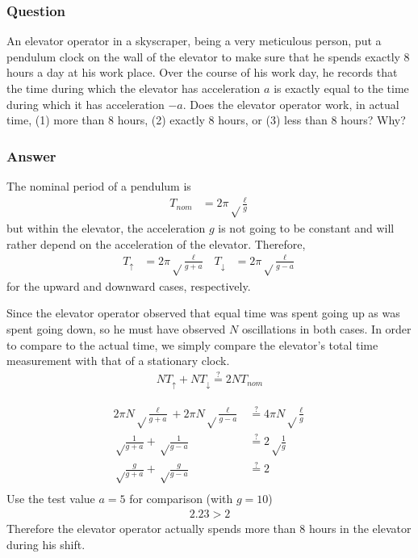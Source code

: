 \subsubsection{Question}

An elevator operator in a skyscraper, being a very meticulous person, put a
pendulum clock on the wall of the elevator to make sure that he spends exactly 8
hours a day at his work place. Over the course of his work day, he records that
the time during which the elevator has acceleration $a$ is exactly equal to the
time during which it has acceleration $-a$. Does the elevator operator work, in
actual time, (1) more than 8 hours, (2) exactly 8 hours, or (3) less than 8
hours? Why?

\subsubsection{Answer}
The nominal period of a pendulum is
\begin{align*}
	T_{nom} &= 2{\pi} \sqrt\frac{\ell }{g}
\end{align*}
but within the elevator, the acceleration $g$ is not going to be constant and
will rather depend on the acceleration of the elevator. Therefore,
\begin{align*}
	T_\uparrow &= 2{\pi}\sqrt\frac{\ell }{g+a} & T_\downarrow &= 2{\pi}\sqrt\frac{\ell }{g-a}
\end{align*}
for the upward and downward cases, respectively.

Since the elevator operator observed that equal time was spent going up as was
spent going down, so he must have observed $N$ oscillations in both cases. In
order to compare to the actual time, we simply compare the elevator's total time
measurement with that of a stationary clock.
\begin{align*}
	NT_\uparrow + NT_\downarrow \stackrel{?}{=} 2NT_{nom}
\end{align*}

\begin{align*}
	2{\pi} N\sqrt\frac{\ell }{g+a} + 2{\pi} N\sqrt\frac{\ell }{g-a}
		&\stackrel{?}{=} 4{\pi} N\sqrt\frac{\ell }{g}
		\\
	\sqrt\frac{1}{g+a} + \sqrt\frac{1}{g-a} &\stackrel{?}{=} 2\sqrt\frac{1}{g}\\
	\sqrt\frac{g}{g+a} + \sqrt\frac{g}{g-a} &\stackrel{?}{=} 2 \\
\end{align*}
Use the test value $a=5$ for comparison (with $g = 10$)
\begin{align}
	\boxed{
	2.23 > 2
	}
\end{align}
Therefore the elevator operator actually spends more than 8 hours in the
elevator during his shift.

